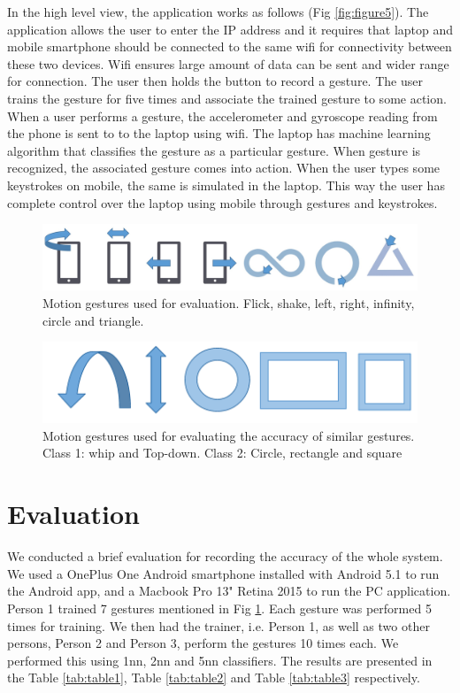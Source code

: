 \documentclass{sigchi}
\begin{document}
In the high level view, the application works as follows  (Fig \ref{fig:figure5}). The application allows the user to enter the IP address and it requires that laptop and mobile smartphone should be connected to the same wifi for connectivity between these two devices. Wifi ensures large amount of data can be sent and wider range for connection. The user then holds the button to record a gesture. The user trains the gesture for five times and associate the trained gesture to some action. When a user performs a gesture, the accelerometer and gyroscope reading from the phone is sent to to the laptop using wifi. The laptop has machine learning algorithm that classifies the gesture as a particular gesture. When gesture is recognized, the associated gesture comes into action. When the user types some keystrokes on mobile, the same is simulated in the laptop. This way the user has complete control over the laptop using mobile through gestures and keystrokes.  


\begin{figure}[t]
\centering
\includegraphics[width=2.0\columnwidth]{gestures}
\caption{Motion gestures used for evaluation. Flick, shake, left, right, infinity, circle and triangle.}
\label{fig:figure6}
\end{figure}

\begin{figure}[!t]
\centering
\includegraphics[width=2.0\columnwidth]{similar}
\caption{Motion gestures used for evaluating the accuracy of similar gestures. Class 1: whip and Top-down. Class 2: Circle, rectangle and square}
\label{fig:figure7}
\end{figure}

\section{Evaluation}

We conducted a brief evaluation for recording the accuracy of the whole system. We used a OnePlus One Android smartphone installed with Android 5.1 to run the Android app, and a Macbook Pro 13" Retina 2015 to run the PC application. Person 1 trained 7 gestures mentioned in Fig \ref{fig:figure6}. Each gesture was performed 5 times for training. We then had the trainer, i.e. Person 1, as well as two other persons, Person 2 and Person 3, perform the gestures 10 times each. We performed this using 1nn, 2nn and 5nn classifiers. The results are presented in the Table \ref{tab:table1}, Table \ref{tab:table2} and Table \ref{tab:table3} respectively. 
\end{document}
